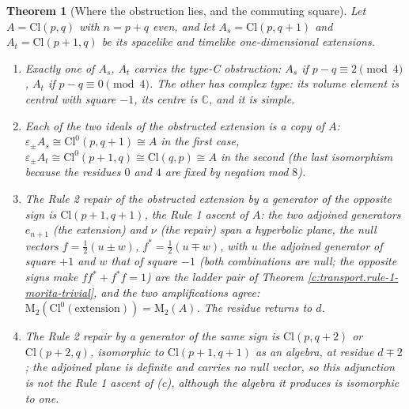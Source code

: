 \documentclass[11pt]{article}
\newtheorem{theorem}{Theorem}[section]
\theoremstyle{definition}
\theoremstyle{plain}
\newcommand{\changedmark}[2]{\marginpar{\raggedright\scriptsize\color{#1}#2}}
\providecommand{\C}{}\renewcommand{\C}{\mathbb{C}}
\providecommand{\Cl}{}\renewcommand{\Cl}{\mathrm{Cl}}
\providecommand{\Mat}{}\renewcommand{\Mat}{\mathrm{M}}
\begin{document}
\begin{theorem}[Where the obstruction lies, and the commuting square]\label{c:transport.where-obstruction-lies-commuting-square}
\changedmark{BurntOrange}{changed since the deposit}
Let $A = \Cl(p,q)$ with $n = p + q$ even, and let $A_s = \Cl(p,q{+}1)$ and $A_t = \Cl(p{+}1,q)$ be its spacelike and timelike one-dimensional extensions.
\begin{enumerate}
\item[(a)] Exactly one of $A_s$, $A_t$ carries the type-C obstruction: $A_s$ if $p - q \equiv 2 \pmod 4$, $A_t$ if $p - q \equiv 0 \pmod 4$. The other has complex type: its volume element is central with square $-1$, its centre is $\C$, and it is simple.
\item[(b)] Each of the two ideals of the obstructed extension is a copy of $A$: $\varepsilon_\pm A_s \cong \Cl^0(p,q{+}1) \cong A$ in the first case, $\varepsilon_\pm A_t \cong \Cl^0(p{+}1,q) \cong \Cl(q,p) \cong A$ in the second (the last isomorphism because the residues $0$ and $4$ are fixed by negation mod $8$).
\item[(c)] The Rule 2 repair of the obstructed extension by a generator of the opposite sign is $\Cl(p{+}1,q{+}1)$, the Rule 1 ascent of $A$: the two adjoined generators $e_{n+1}$ (the extension) and $\nu$ (the repair) span a hyperbolic plane, the null vectors $f = \tfrac12(u \pm w)$, $f^* = \tfrac12(u \mp w)$, with $u$ the adjoined generator of square $+1$ and $w$ that of square $-1$ (both combinations are null; the opposite signs make $ff^* + f^*f = 1$) are the ladder pair of Theorem \ref{c:transport.rule-1-morita-trivial}, and the two amplifications agree: $\Mat_2(\Cl^0(\text{extension})) = \Mat_2(A)$. The residue returns to $d$.
\item[(d)] The Rule 2 repair by a generator of the same sign is $\Cl(p,q{+}2)$ or $\Cl(p{+}2,q)$, isomorphic to $\Cl(p{+}1,q{+}1)$ as an algebra, at residue $d \mp 2$; the adjoined plane is definite and carries no null vector, so this adjunction is not the Rule 1 ascent of (c), although the algebra it produces is isomorphic to one.
\end{enumerate}
\end{theorem}
\end{document}
